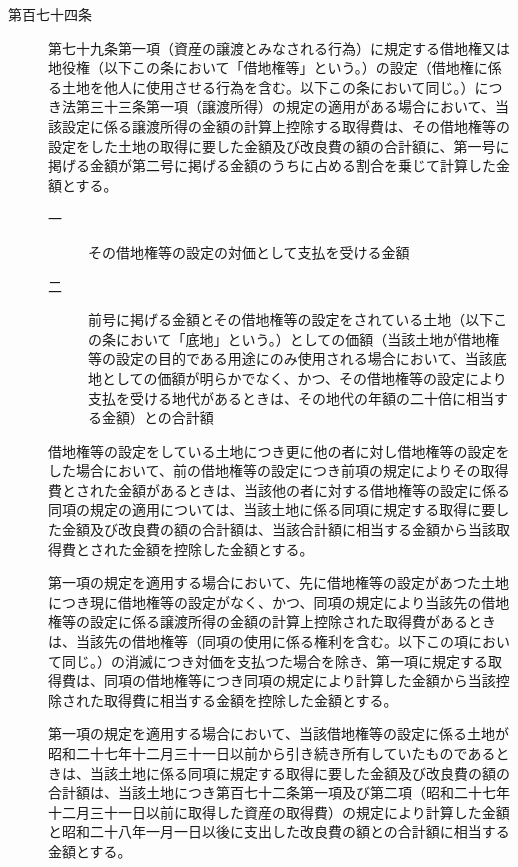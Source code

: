 \documentclass[twocolumn,a4j,10pt]{ltjtarticle}
\begin{document}
\begin{description}
\item[第百七十四条]第七十九条第一項（資産の譲渡とみなされる行為）に規定する借地権又は地役権（以下この条において「借地権等」という。）の設定（借地権に係る土地を他人に使用させる行為を含む。以下この条において同じ。）につき法第三十三条第一項（譲渡所得）の規定の適用がある場合において、当該設定に係る譲渡所得の金額の計算上控除する取得費は、その借地権等の設定をした土地の取得に要した金額及び改良費の額の合計額に、第一号に掲げる金額が第二号に掲げる金額のうちに占める割合を乗じて計算した金額とする。
\begin{description}
\item[一]その借地権等の設定の対価として支払を受ける金額
\item[二]前号に掲げる金額とその借地権等の設定をされている土地（以下この条において「底地」という。）としての価額（当該土地が借地権等の設定の目的である用途にのみ使用される場合において、当該底地としての価額が明らかでなく、かつ、その借地権等の設定により支払を受ける地代があるときは、その地代の年額の二十倍に相当する金額）との合計額
\end{description}
\item[]借地権等の設定をしている土地につき更に他の者に対し借地権等の設定をした場合において、前の借地権等の設定につき前項の規定によりその取得費とされた金額があるときは、当該他の者に対する借地権等の設定に係る同項の規定の適用については、当該土地に係る同項に規定する取得に要した金額及び改良費の額の合計額は、当該合計額に相当する金額から当該取得費とされた金額を控除した金額とする。
\item[]第一項の規定を適用する場合において、先に借地権等の設定があつた土地につき現に借地権等の設定がなく、かつ、同項の規定により当該先の借地権等の設定に係る譲渡所得の金額の計算上控除された取得費があるときは、当該先の借地権等（同項の使用に係る権利を含む。以下この項において同じ。）の消滅につき対価を支払つた場合を除き、第一項に規定する取得費は、同項の借地権等につき同項の規定により計算した金額から当該控除された取得費に相当する金額を控除した金額とする。
\item[]第一項の規定を適用する場合において、当該借地権等の設定に係る土地が昭和二十七年十二月三十一日以前から引き続き所有していたものであるときは、当該土地に係る同項に規定する取得に要した金額及び改良費の額の合計額は、当該土地につき第百七十二条第一項及び第二項（昭和二十七年十二月三十一日以前に取得した資産の取得費）の規定により計算した金額と昭和二十八年一月一日以後に支出した改良費の額との合計額に相当する金額とする。
\end{description}
\end{document}
